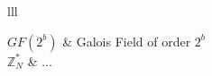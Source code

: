 \documentclass[
11pt, %
english, %
singlespacing, %
headsepline, %
]{MastersDoctoralThesis} %
\theoremstyle{remark}
\begin{document}

%
%
%


\begin{symbols}{lll} %

$GF(2^b)$ & Galois Field of order $2^b$\\
$\mathbb{Z}_N^{*}$ & ...\\
%
%

\end{symbols}




\mainmatter %

\pagestyle{thesis} %
\end{document}
